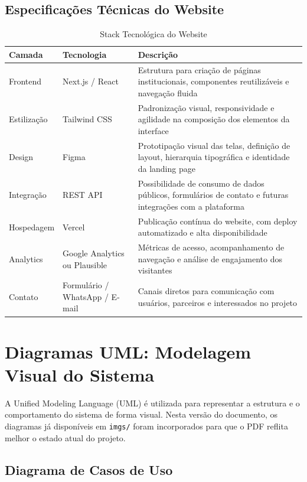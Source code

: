 \documentclass[11pt,a4paper]{article}
\begin{document}
\subsection{Especificações Técnicas do Website}

\begin{table}[H]
\centering
\caption{Stack Tecnológica do Website}
\label{tab:stack-web}
\begin{tabular}{|l|l|p{6cm}|}
\hline
\textbf{Camada} & \textbf{Tecnologia} & \textbf{Descrição} \\
\hline
Frontend & Next.js / React & Estrutura para criação de páginas institucionais, componentes reutilizáveis e navegação fluida \\
\hline
Estilização & Tailwind CSS & Padronização visual, responsividade e agilidade na composição dos elementos da interface \\
\hline
Design & Figma & Prototipação visual das telas, definição de layout, hierarquia tipográfica e identidade da landing page \\
\hline
Integração & REST API & Possibilidade de consumo de dados públicos, formulários de contato e futuras integrações com a plataforma \\
\hline
Hospedagem & Vercel & Publicação contínua do website, com deploy automatizado e alta disponibilidade \\
\hline
Analytics & Google Analytics ou Plausible & Métricas de acesso, acompanhamento de navegação e análise de engajamento dos visitantes \\
\hline
Contato & Formulário / WhatsApp / E-mail & Canais diretos para comunicação com usuários, parceiros e interessados no projeto \\
\hline
\end{tabular}
\end{table}

\section{Diagramas UML: Modelagem Visual do Sistema}

A Unified Modeling Language (UML) \cite{kumar2024} é utilizada para representar a estrutura e o comportamento do sistema de forma visual. Nesta versão do documento, os diagramas já disponíveis em \texttt{imgs/} foram incorporados para que o PDF reflita melhor o estado atual do projeto.

\subsection{Diagrama de Casos de Uso}
\end{document}
